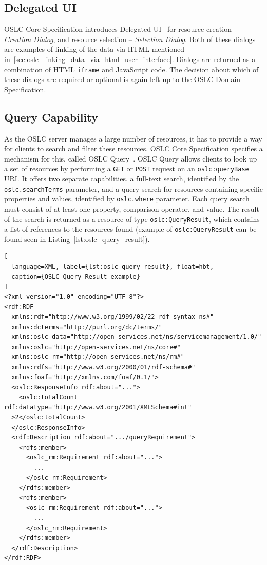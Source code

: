 \subsection*{Delegated UI}
OSLC Core Specification introduces Delegated UI \cite{oslc_core_delegated_ui} for resource creation -- \emph{Creation Dialog}, and resource selection -- \emph{Selection Dialog}. Both of these dialogs are examples of linking of the data via HTML mentioned in \ref{sec:oslc_linking_data_via_html_user_interface}. Dialogs are returned as a combination of HTML \texttt{iframe} and JavaScript code. The decision about which of these dialogs are required or optional is again left up to the OSLC Domain Specification.

\subsection*{Query Capability}
As the OSLC server manages a large number of resources, it has to provide a way for clients to search and filter these resources. OSLC Core Specification specifies a mechanism for this, called OSLC Query \cite{oslc_core_query}. OSLC Query allows clients to look up a set of resources by performing a \texttt{GET} or \texttt{POST} request on an \texttt{oslc:queryBase} URI. It offers two separate capabilities, a full-text search, identified by the \texttt{oslc.searchTerms} parameter, and a query search for resources containing specific properties and values, identified by \texttt{oslc.where} parameter. Each query search must consist of at least one property, comparison operator, and value. The result of the search is returned as a resource of type \texttt{oslc:QueryResult}, which contains a list of references to the resources found (example of \texttt{oslc:QueryResult} can be found seen in Listing \ref{lst:oslc_query_result}).

\begin{lstlisting}[
  language=XML, label={lst:oslc_query_result}, float=hbt,
  caption={OSLC Query Result example}
]
<?xml version="1.0" encoding="UTF-8"?>
<rdf:RDF
  xmlns:rdf="http://www.w3.org/1999/02/22-rdf-syntax-ns#"
  xmlns:dcterms="http://purl.org/dc/terms/"
  xmlns:oslc_data="http://open-services.net/ns/servicemanagement/1.0/"
  xmlns:oslc="http://open-services.net/ns/core#"
  xmlns:oslc_rm="http://open-services.net/ns/rm#"
  xmlns:rdfs="http://www.w3.org/2000/01/rdf-schema#"
  xmlns:foaf="http://xmlns.com/foaf/0.1/">
  <oslc:ResponseInfo rdf:about="...">
    <oslc:totalCount rdf:datatype="http://www.w3.org/2001/XMLSchema#int"
  >2</oslc:totalCount>
  </oslc:ResponseInfo>
  <rdf:Description rdf:about=".../queryRequirement">
    <rdfs:member>
      <oslc_rm:Requirement rdf:about="...">
        ...
      </oslc_rm:Requirement>
    </rdfs:member>
    <rdfs:member>
      <oslc_rm:Requirement rdf:about="...">
        ...
      </oslc_rm:Requirement>
    </rdfs:member>
  </rdf:Description>
</rdf:RDF>
\end{lstlisting}

